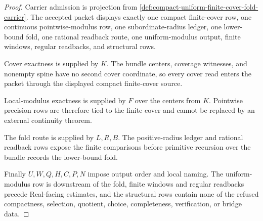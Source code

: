\begin{proof}
Carrier admission is projection from \autoref{def:compact-uniform-finite-cover-fold-carrier}. The accepted packet displays exactly one compact finite-cover row, one continuous pointwise-modulus row, one subordinate-radius ledger, one lower-bound fold, one rational readback route, one uniform-modulus output, finite windows, regular readbacks, and structural rows.

Cover exactness is supplied by $K$. The bundle centers, coverage witnesses, and nonempty spine have no second cover coordinate, so every cover read enters the packet through the displayed compact finite-cover source.

Local-modulus exactness is supplied by $F$ over the centers from $K$. Pointwise precision rows are therefore tied to the finite cover and cannot be replaced by an external continuity theorem.

The fold route is supplied by $L,R,B$. The positive-radius ledger and rational readback rows expose the finite comparisons before primitive recursion over the bundle records the lower-bound fold.

Finally $U,W,Q,H,C,P,N$ impose output order and local naming. The uniform-modulus row is downstream of the fold, finite windows and regular readbacks precede Real-facing estimates, and the structural rows contain none of the refused compactness, selection, quotient, choice, completeness, verification, or bridge data.
\end{proof}

